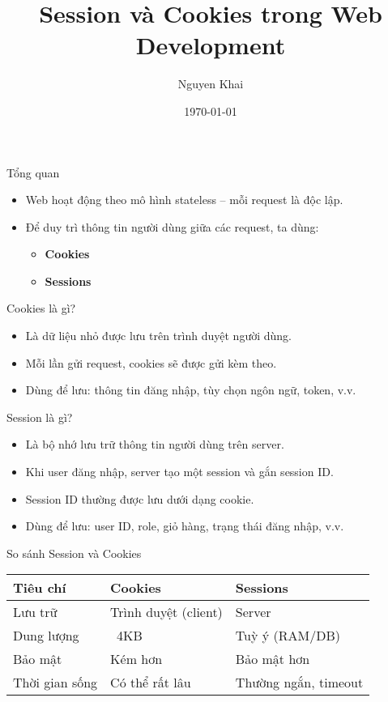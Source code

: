 \documentclass{beamer}
\title{Session và Cookies trong Web Development}
\author{Nguyen Khai}
\date{\today}
\begin{document}
\begin{frame}
  \titlepage
\end{frame}

\begin{frame}{Tổng quan}
  \begin{itemize}
    \item Web hoạt động theo mô hình stateless – mỗi request là độc lập.
    \item Để duy trì thông tin người dùng giữa các request, ta dùng:
    \begin{itemize}
      \item \textbf{Cookies}
      \item \textbf{Sessions}
    \end{itemize}
  \end{itemize}
\end{frame}

\begin{frame}{Cookies là gì?}
  \begin{itemize}
    \item Là dữ liệu nhỏ được lưu trên trình duyệt người dùng.
    \item Mỗi lần gửi request, cookies sẽ được gửi kèm theo.
    \item Dùng để lưu: thông tin đăng nhập, tùy chọn ngôn ngữ, token, v.v.
  \end{itemize}
\end{frame}

\begin{frame}{Session là gì?}
  \begin{itemize}
    \item Là bộ nhớ lưu trữ thông tin người dùng trên server.
    \item Khi user đăng nhập, server tạo một session và gắn session ID.
    \item Session ID thường được lưu dưới dạng cookie.
    \item Dùng để lưu: user ID, role, giỏ hàng, trạng thái đăng nhập, v.v.
  \end{itemize}
\end{frame}

\begin{frame}{So sánh Session và Cookies}
  \begin{tabular}{|l|l|l|}
    \hline
    \textbf{Tiêu chí} & \textbf{Cookies} & \textbf{Sessions} \\
    \hline
    Lưu trữ & Trình duyệt (client) & Server \\
    \hline
    Dung lượng & ~4KB & Tuỳ ý (RAM/DB) \\
    \hline
    Bảo mật & Kém hơn & Bảo mật hơn \\
    \hline
    Thời gian sống & Có thể rất lâu & Thường ngắn, timeout \\
    \hline
  \end{tabular}
\end{frame}
\end{document}
